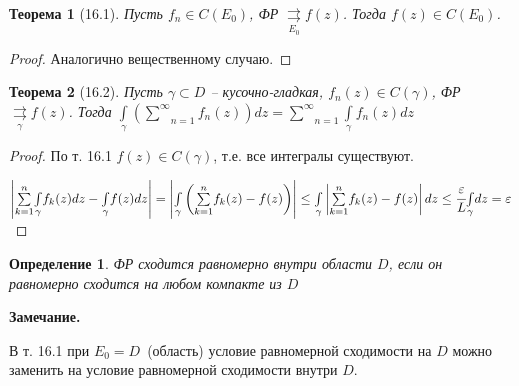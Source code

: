 \documentclass[draft]{report}
\newcommand{\rrae}[1]{\underset{#1}{\rightrightarrows}}
\newcommand{\mint}[2]{\underset{#1}{\overset{#2}{\int}}}
\newcommand{\msum}[2]{\underset{#1}{\overset{#2}{\sum}}}
\newcommand{\g}{\gamma}
\newcommand{\e}{\varepsilon}
\newcommand{\opr}[1]{\begin{opred}#1\end{opred}}
\newtheorem*{theor}{Теорема}
\newtheorem*{opred}{Определение}
\theoremstyle{remark}
\begin{document}
\begin{theor}[16.1]
Пусть $f_n\in C(E_0)$, ФР $\rrae{E_0}f(z)$. Тогда $f(z)\in C(E_0)$.
\end{theor}
\begin{proof}
Аналогично вещественному случаю.
\end{proof}

\begin{theor}[16.2]
Пусть $\g\subset D$ -- кусочно-гладкая, $f_n(z)\in C(\g)$, ФР$\rrae{\g}f(z)$. Тогда $\mint{\g}{}\left(\msum{n=1}{\infty}f_n(z)\right)dz=\msum{n=1}{\infty}\mint{\g}{}f_n(z)dz$
\end{theor}
\begin{proof}
По т. 16.1 $f(z)\in C(\g)$, т.е. все интегралы существуют.

$\left|\msum{k=1}{n}\mint{\g}{}f_k(z)dz-\mint{\g}{}f(z)dz\right|=\left|\mint{\g}{}\left(\msum{k=1}{n}f_k(z)-f(z)\right)\right|\leq\mint{\g}{}\left|\msum{k=1}{n}f_k(z)-f(z)\right|dz\leq\cfrac \e L\mint{\g}{}dz=\e$
\end{proof}

\opr{ФР сходится равномерно внутри области $D$, если он равномерно сходится на любом компакте из $D$}

{\bfseries Замечание.}

В т. 16.1 при $E_0=D$~(область) условие равномерной сходимости на $D$ можно заменить на условие равномерной сходимости внутри $D$.
\end{document}
